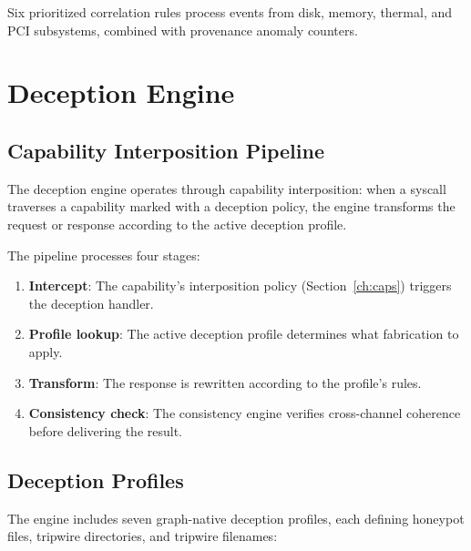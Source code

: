 \documentclass[11pt,a4paper,twoside]{report}
\theoremstyle{definition}
\begin{document}
Six prioritized correlation rules process events from disk, memory, thermal,
and PCI subsystems, combined with provenance anomaly counters.


\chapter{Deception Engine}
\label{ch:deception}

\section{Capability Interposition Pipeline}

The deception engine operates through capability interposition: when a
syscall traverses a capability marked with a deception policy, the engine
transforms the request or response according to the active deception
profile.

The pipeline processes four stages:
\begin{enumerate}[leftmargin=1.4em]
  \item \textbf{Intercept}: The capability's interposition policy
    (Section~\ref{ch:caps}) triggers the deception handler.
  \item \textbf{Profile lookup}: The active deception profile determines
    what fabrication to apply.
  \item \textbf{Transform}: The response is rewritten according to the
    profile's rules.
  \item \textbf{Consistency check}: The consistency engine verifies
    cross-channel coherence before delivering the result.
\end{enumerate}

\section{Deception Profiles}

The engine includes seven graph-native deception profiles, each defining
honeypot files, tripwire directories, and tripwire filenames:
\end{document}
